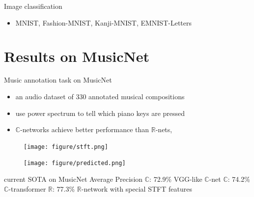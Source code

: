 \documentclass{beamer}
\newcommand{\real}{\mathbb{R}}
\newcommand{\cplx}{\mathbb{C}}
\begin{document}

\begin{frame}[t]{\insertsection}
  Image classification
  \begin{itemize}
    \item MNIST, Fashion-MNIST, Kanji-MNIST, EMNIST-Letters
  \end{itemize}
\end{frame}

\section{Results on MusicNet} %
\label{sec:results_on_musicnet}

\begin{frame}[c]{\insertsection}

Music annotation task on MusicNet \citet{thickstun_learning_2017}
\begin{itemize}
  \item an audio dataset of $330$ annotated musical compositions
  \item use power spectrum to tell which piano keys are pressed
  \item $\cplx$-networks achieve better performance than $\real$-nets,
  \cite{trabelsi_deep_2018}
\end{itemize}
\begin{figure}[t]
  \centering
  \texttt{[image: figure/stft.png]}
  \par
  \texttt{[image: figure/predicted.png]}
\end{figure}

\medskip
current SOTA on MusicNet Average Precision
$\cplx$: 72.9\% \citet{trabelsi_deep_2018} VGG-like $\cplx$-net
$\cplx$: 74.2\% \citet{yang_complex_2019} $\cplx$-transformer
$\real$: 77.3\% \citet{thickstun_invariances_2018} $\real$-network with special
STFT features \citet{citation_needed}

\end{frame}
\end{document}
